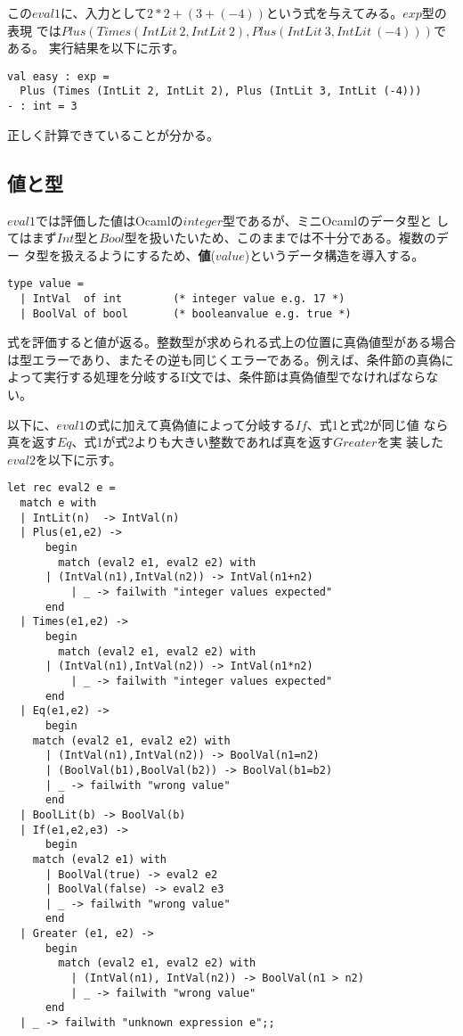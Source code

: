 \documentclass[a4paper,9pt]{jsarticle}
\begin{document}
この$eval1$に、入力として$2*2+(3+(-4))$という式を与えてみる。$exp$型の表現
では$Plus(Times(IntLit\ 2, IntLit\ 2), Plus(IntLit\ 3, IntLit\ (-4)))$である。
実行結果を以下に示す。

\begin{lstlisting}
val easy : exp =
  Plus (Times (IntLit 2, IntLit 2), Plus (IntLit 3, IntLit (-4)))
- : int = 3
\end{lstlisting}
正しく計算できていることが分かる。

\subsection{値と型}
$eval1$では評価した値はOcamlの$integer$型であるが、ミニOcamlのデータ型と
してはまず$Int$型と$Bool$型を扱いたいため、このままでは不十分である。複数のデー
タ型を扱えるようにするため、{\bf{値}}($value$)というデータ構造を導入する。

\begin{lstlisting}
type value = 
  | IntVal  of int        (* integer value e.g. 17 *)
  | BoolVal of bool       (* booleanvalue e.g. true *)
\end{lstlisting}

式を評価すると値が返る。整数型が求められる式上の位置に真偽値型がある場合
は型エラーであり、またその逆も同じくエラーである。例えば、条件節の真偽に
よって実行する処理を分岐するIf文では、条件節は真偽値型でなければならない。

以下に、$eval1$の式に加えて真偽値によって分岐する$If$、式1と式2が同じ値
なら真を返す$Eq$、式1が式2よりも大きい整数であれば真を返す$Greater$を実
装した$eval2$を以下に示す。


\begin{lstlisting}
let rec eval2 e =
  match e with
  | IntLit(n)  -> IntVal(n)
  | Plus(e1,e2) ->   
      begin
        match (eval2 e1, eval2 e2) with
	  | (IntVal(n1),IntVal(n2)) -> IntVal(n1+n2)
          | _ -> failwith "integer values expected"
      end
  | Times(e1,e2) ->
      begin
        match (eval2 e1, eval2 e2) with
	  | (IntVal(n1),IntVal(n2)) -> IntVal(n1*n2)
          | _ -> failwith "integer values expected"
      end
  | Eq(e1,e2) ->
      begin
	match (eval2 e1, eval2 e2) with
	  | (IntVal(n1),IntVal(n2)) -> BoolVal(n1=n2)
	  | (BoolVal(b1),BoolVal(b2)) -> BoolVal(b1=b2)
	  | _ -> failwith "wrong value"
      end
  | BoolLit(b) -> BoolVal(b)
  | If(e1,e2,e3) ->
      begin
	match (eval2 e1) with
	  | BoolVal(true) -> eval2 e2
	  | BoolVal(false) -> eval2 e3
	  | _ -> failwith "wrong value"
      end
  | Greater (e1, e2) ->
      begin
        match (eval2 e1, eval2 e2) with
          | (IntVal(n1), IntVal(n2)) -> BoolVal(n1 > n2)
          | _ -> failwith "wrong value"
      end
  | _ -> failwith "unknown expression e";;
\end{lstlisting}
\end{document}
